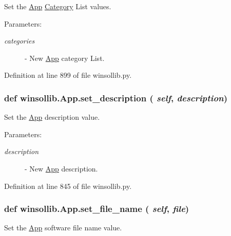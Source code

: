 Set the \hyperlink{classwinsollib_1_1App}{App} \hyperlink{classwinsollib_1_1Category}{Category} List values. 

\begin{Desc}
\item[Parameters:]
\begin{description}
\item[{\em categories}]- New \hyperlink{classwinsollib_1_1App}{App} category List. \end{description}
\end{Desc}


Definition at line 899 of file winsollib.py.\hypertarget{classwinsollib_1_1App_b6ff31455b7695f3798c22fc4c457049}{
\subsubsection[set\_\-description]{\setlength{\rightskip}{0pt plus 5cm}def winsollib.App.set\_\-description ( {\em self},  {\em description})}}
\label{classwinsollib_1_1App_b6ff31455b7695f3798c22fc4c457049}


Set the \hyperlink{classwinsollib_1_1App}{App} description value. 

\begin{Desc}
\item[Parameters:]
\begin{description}
\item[{\em description}]- New \hyperlink{classwinsollib_1_1App}{App} description. \end{description}
\end{Desc}


Definition at line 845 of file winsollib.py.\hypertarget{classwinsollib_1_1App_ff314b21ddd0858fb855e6f841d4205d}{
\subsubsection[set\_\-file\_\-name]{\setlength{\rightskip}{0pt plus 5cm}def winsollib.App.set\_\-file\_\-name ( {\em self},  {\em file})}}
\label{classwinsollib_1_1App_ff314b21ddd0858fb855e6f841d4205d}


Set the \hyperlink{classwinsollib_1_1App}{App} software file name value. 

